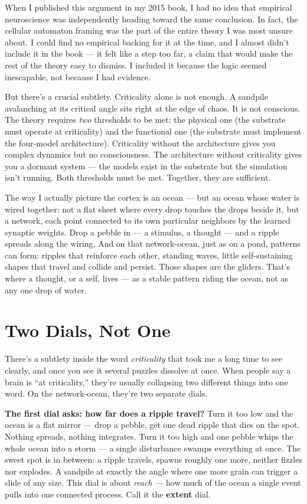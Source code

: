 \documentclass[11pt, twoside, openright]{book}
\begin{document}
When I published this argument in my 2015 book, I had no idea that empirical neuroscience was independently heading toward the same conclusion. In fact, the cellular automaton framing was the part of the entire theory I was most unsure about. I could find no empirical backing for it at the time, and I almost didn't include it in the book --- it felt like a step too far, a claim that would make the rest of the theory easy to dismiss. I included it because the logic seemed inescapable, not because I had evidence.

But there's a crucial subtlety. Criticality alone is not enough. A sandpile avalanching at its critical angle sits right at the edge of chaos. It is not conscious. The theory requires \textit{two} thresholds to be met: the physical one (the substrate must operate at criticality) and the functional one (the substrate must implement the four-model architecture). Criticality without the architecture gives you complex dynamics but no consciousness. The architecture without criticality gives you a dormant system --- the models exist in the substrate but the simulation isn't running. Both thresholds must be met. Together, they are sufficient.

The way I actually picture the cortex is an ocean --- but an ocean whose water is wired together: not a flat sheet where every drop touches the drops beside it, but a network, each point connected to its own particular neighbors by the learned synaptic weights. Drop a pebble in --- a stimulus, a thought --- and a ripple spreads along the wiring. And on that network-ocean, just as on a pond, patterns can form: ripples that reinforce each other, standing waves, little self-sustaining shapes that travel and collide and persist. Those shapes are the gliders. That's where a thought, or a self, lives --- as a stable pattern riding the ocean, not as any one drop of water.

\section*{Two Dials, Not One}

There's a subtlety inside the word \textit{criticality} that took me a long time to see clearly, and once you see it several puzzles dissolve at once. When people say a brain is ``at criticality,'' they're usually collapsing two different things into one word. On the network-ocean, they're two separate dials.

\textbf{The first dial asks: how far does a ripple travel?} Turn it too low and the ocean is a flat mirror --- drop a pebble, get one dead ripple that dies on the spot. Nothing spreads, nothing integrates. Turn it too high and one pebble whips the whole ocean into a storm --- a single disturbance swamps everything at once. The sweet spot is in between: a ripple travels, spawns roughly one more, neither fizzles nor explodes. A sandpile at exactly the angle where one more grain can trigger a slide of any size. This dial is about \textit{reach} --- how much of the ocean a single event pulls into one connected process. Call it the \textbf{extent} dial.
\end{document}
